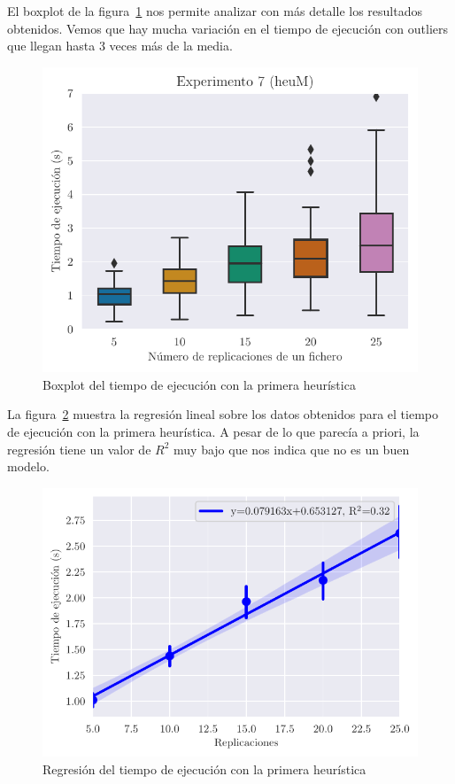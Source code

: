El boxplot de la figura~\ref{fig:ex7time} nos permite analizar con más detalle los resultados obtenidos.
Vemos que hay mucha variación en el tiempo de ejecución con outliers que llegan hasta 3 veces más de la media.

\begin{figure}[H]
    \centering
    \includegraphics{include/plots/ex7_time_bplot.pdf}
    \caption{Boxplot del tiempo de ejecución con la primera heurística}%
    \label{fig:ex7time}
\end{figure}

La figura~\ref{fig:ex7reg} muestra la regresión lineal sobre los datos obtenidos para el tiempo de ejecución con
la primera heurística. A pesar de lo que parecía a priori, la regresión tiene un valor de $R^2$ muy bajo
que nos indica que no es un buen modelo.

\begin{figure}[H]
    \centering
    \includegraphics{include/plots/ex7_time_reg.pdf}
    \caption{Regresión del tiempo de ejecución con la primera heurística}%
    \label{fig:ex7reg}
\end{figure}

